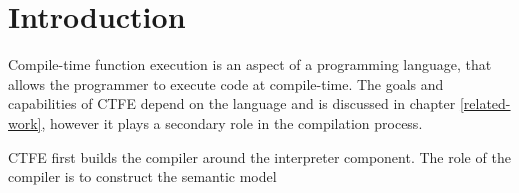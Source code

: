 \section{Introduction}

Compile-time function execution is an aspect of a programming language, that allows the programmer to execute code at compile-time.
The goals and capabilities of CTFE depend on the language and is discussed in chapter \ref{related-work}, however it plays a secondary role in the compilation process.

CTFE first builds the compiler around the interpreter component.
The role of the compiler is to construct the semantic model
